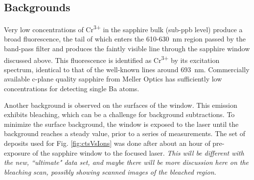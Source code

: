 \documentclass[aps,pra,reprint,superscriptaddress]{revtex4-1}
\begin{document}



\subsection{Backgrounds}
\label{sec:backgrounds}

Very low concentrations of Cr\textsuperscript{3+} in the sapphire bulk (sub-ppb level) produce a broad fluorescence, the tail of which enters the 610-630~nm region passed by the band-pass filter and produces the faintly visible line through the sapphire window discussed above.  This fluorescence is identified as Cr\textsuperscript{3+} by its excitation spectrum, identical to that of the well-known lines around 693~nm.  Commercially available c-plane quality sapphire from Meller Optics has sufficiently low concentrations for detecting single Ba atoms.

Another background is observed on the surfaces of the window.  This emission exhibits bleaching, which can be a challenge for background subtractions.  To minimize the surface background, the window is exposed to the laser until the background reaches a steady value, prior to a series of measurements.  The set of deposits used for Fig. \ref{fig:ctsVsIons} was done after about an hour of pre-exposure of the sapphire window to the focused laser.  \emph{\color{gray}This will be different with the new, ``ultimate" data set, and maybe there will be more discussion here on the bleaching scan, possibly showing scanned images of the bleached region.}
\end{document}
